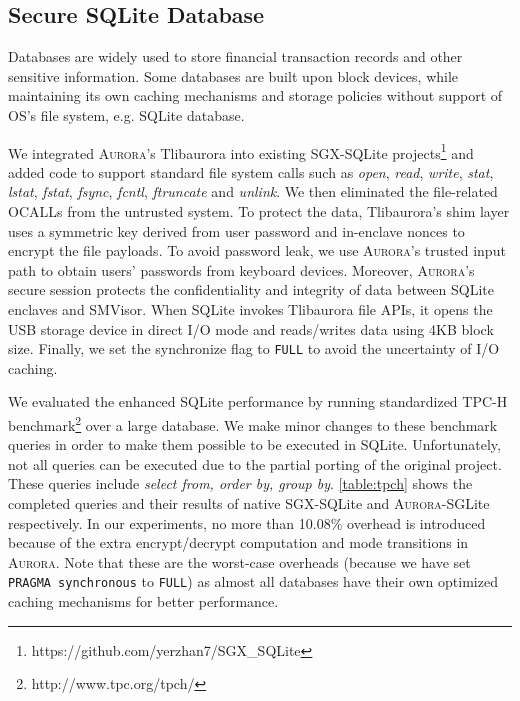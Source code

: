 \documentclass[journal,twocolumn,letterpaper,10pt]{IEEEtran}
\begin{document}
\subsection{Secure SQLite Database}
Databases are widely used to store financial transaction records and other sensitive information. Some databases are built upon block devices, while maintaining its own caching mechanisms and storage policies without support of OS's file system, e.g. SQLite database.

We integrated \textsc{Aurora}'s Tlibaurora into existing SGX-SQLite projects\footnote{https://github.com/yerzhan7/SGX\_SQLite} and added code to support standard file system calls such as \textit{open}, \textit{read}, \textit{write}, \textit{stat}, \textit{lstat}, \textit{fstat}, \textit{fsync}, \textit{fcntl}, \textit{ftruncate} and \textit{unlink}. We then eliminated the file-related OCALLs from the untrusted system. 
To protect the data, Tlibaurora's shim layer uses a symmetric key derived from user password and in-enclave nonces to encrypt the file payloads. %
To avoid password leak, we use \textsc{Aurora}'s trusted input path to obtain users' passwords from keyboard devices. Moreover, \textsc{Aurora}'s secure session protects the confidentiality and integrity of data between SQLite enclaves and SMVisor.
When SQLite invokes Tlibaurora file APIs, it opens the USB storage device in direct I/O mode and reads/writes data using 4KB block size. 
Finally, %
we set the synchronize flag to \texttt{FULL} to avoid the uncertainty of I/O caching.

We evaluated the enhanced SQLite performance by running standardized TPC-H benchmark\footnote{http://www.tpc.org/tpch/} over a large database. %
We make minor changes to these benchmark queries in order to make them possible to be executed in SQLite. Unfortunately, not all queries can be executed due to the partial porting of the original project. These queries include \textit{select from, order by, group by}.
\autoref{table:tpch} shows the completed queries and their results of native SGX-SQLite and \textsc{Aurora}-SGLite respectively. In our experiments, no more than 10.08\% overhead is introduced because of the extra encrypt/decrypt computation and mode transitions in \textsc{Aurora}.
Note that these are the worst-case overheads (because we have set \texttt{PRAGMA synchronous} to \texttt{FULL}) as almost all databases have their own optimized caching mechanisms for better performance.
\end{document}
